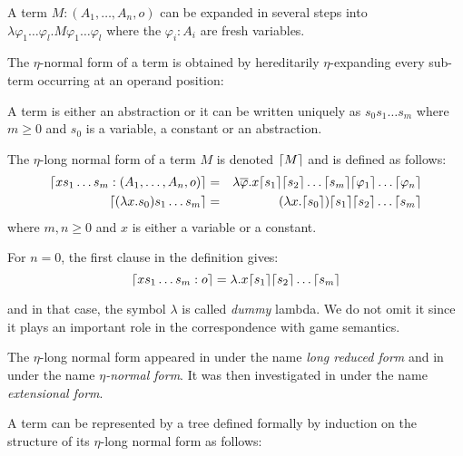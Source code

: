 A term $M : (A_1,\ldots,A_n,o)$ can be expanded in several steps
into $\lambda \varphi_1 \ldots \varphi_l . M \varphi_1 \ldots
\varphi_l$ where the $\varphi_i:A_i$ are fresh variables.

The $\eta$-normal form of a term is obtained by hereditarily $\eta$-expanding every sub-term occurring
at an operand position:

\begin{dfn}
A term is either an abstraction or it can be written uniquely as
$s_0 s_1 \ldots s_m$ where $m\geq0$ and $s_0$ is a variable, a
constant or an abstraction.

The $\eta$-long normal form of a term $M$ is denoted $\lceil M\rceil$ and
is defined as follows:
\begin{eqnarray*}
\lceil x s_1 \ldots s_m : (A_1,\ldots,A_n,o)\rceil &=& \lambda \overline{\varphi} . x \lceil s_1\rceil \lceil s_2\rceil \ldots \lceil s_m\rceil \lceil \varphi_1\rceil \ldots \lceil \varphi_n\rceil \\
\lceil (\lambda x . s_0) s_1 \ldots s_m \rceil &=& (\lambda x . \lceil s_0\rceil) \lceil s_1\rceil \lceil s_2\rceil \ldots \lceil s_m\rceil
\end{eqnarray*}
where $m,n \geq 0$ and $x$ is either a variable or a constant.
\end{dfn}

For $n=0$, the first clause in the definition gives:
$$\lceil x s_1 \ldots s_m : o\rceil = \lambda . x \lceil s_1\rceil \lceil s_2\rceil \ldots \lceil s_m\rceil $$

and in that case, the symbol $\lambda$ is called \textsl{dummy} lambda. We do not omit it since it
plays an important role in the correspondence with game semantics.


The $\eta$-long normal form appeared in \citep{DBLP:journals/tcs/JensenP76}
under the name \emph{long reduced form}
and in \citep{DBLP:journals/tcs/Huet75}
under the name \emph{$\eta$-normal form}. It was then investigated in \citep{huet76}
under the name \emph{extensional form}.


A term can be represented by a tree defined formally by induction on the structure
of its $\eta$-long normal form as follows:

